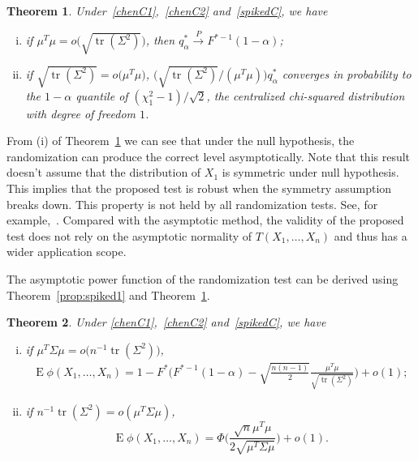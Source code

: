 \documentclass[3p]{elsarticle}
\DeclareMathOperator{\mytr}{tr}
\DeclareMathOperator{\myE}{E}
\theoremstyle{plain}
\newtheorem{theorem}{\quad\quad Theorem}
\theoremstyle{definition}
\theoremstyle{remark}
\begin{document}
\begin{theorem}\label{ourTheorem}
    Under~\eqref{chenC1},~\eqref{chenC2} and~\eqref{spikedC},
    we have
    \begin{enumerate}[(i)]
        \item
            if $\mu^T \mu=o\big(\sqrt{\mytr(\Sigma^2)}\big)$, then
            $
            q_{\alpha}^*\xrightarrow{P}F^{*-1}(1-\alpha)
            $;
\item
    if $\sqrt{\mytr(\Sigma^2)}=o\big(\mu^T \mu\big)$, $\big(\sqrt{\mytr(\Sigma^2)}/(\mu^T \mu)\big)q_{\alpha}^*$ converges in probability to the $1-\alpha$ quantile of  $(\chi^2_1-1)/\sqrt{2}$, the centralized chi-squared distribution with degree of freedom $1$.
    \end{enumerate}
\end{theorem}
From (i) of Theorem~\ref{ourTheorem} we can see that under the null hypothesis, the randomization can produce the correct level asymptotically.
Note that this result doesn't assume that the distribution of $X_1$ is symmetric under null hypothesis.
This implies that the proposed test is robust when the symmetry assumption breaks down.
This property is not held by all randomization tests.
See, for example,~\cite{Romano1990On}.
Compared with the asymptotic method, the validity of the proposed test does not rely on the asymptotic normality of $T(X_1,\ldots,X_n)$ and thus has a wider application scope.



The asymptotic power function of the randomization test can be derived using Theorem~\ref{prop:spiked1} and Theorem~\ref{ourTheorem}.

\begin{theorem}\label{theoremPower}
    Under \eqref{chenC1},~\eqref{chenC2} and~\eqref{spikedC}, we have
    \begin{enumerate}[(i)]
        \item
            if $\mu^T \Sigma \mu= o\big(n^{-1}\mytr(\Sigma^2)\big)$,
    \begin{equation*}\label{oPower}
        \begin{aligned}
            \myE \phi(X_1,\ldots,X_n)=
            1- F^*\bigg(F^{*-1}(1-\alpha)-\sqrt{\frac{n(n-1)}{2}}\frac{\mu^T\mu}{\sqrt{\mytr (\Sigma^2)}}\bigg)+o(1);
        \end{aligned}
    \end{equation*}
\item
    if $n^{-1}\mytr(\Sigma^2)=o(\mu^T \Sigma \mu )$,
    \begin{equation*}\label{oPower2}
            \myE \phi(X_1,\ldots,X_n)=
            \Phi\Big(\frac{\sqrt{n}\mu^T\mu}{2\sqrt{\mu^T \Sigma \mu}}\Big)+o(1).
    \end{equation*}

    \end{enumerate}
\end{theorem}
\end{document}
